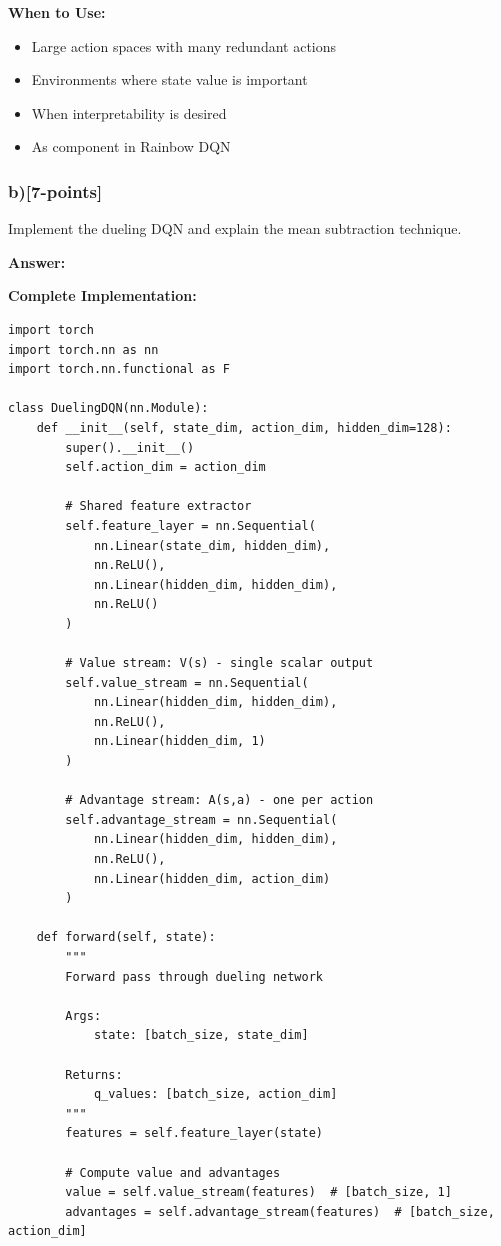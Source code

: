 \documentclass[12pt]{article}
\begin{document}
{{\textbf{When to Use:}
\begin{itemize}
\item Large action spaces with many redundant actions
\item Environments where state value is important
\item When interpretability is desired
\item As component in Rainbow DQN
\end{itemize}

\subsubsection{b)[7-points]} Implement the dueling DQN and explain the mean subtraction technique.

\textbf{Answer:}

\textbf{Complete Implementation:}

\begin{verbatim}
import torch
import torch.nn as nn
import torch.nn.functional as F

class DuelingDQN(nn.Module):
    def __init__(self, state_dim, action_dim, hidden_dim=128):
        super().__init__()
        self.action_dim = action_dim
        
        # Shared feature extractor
        self.feature_layer = nn.Sequential(
            nn.Linear(state_dim, hidden_dim),
            nn.ReLU(),
            nn.Linear(hidden_dim, hidden_dim),
            nn.ReLU()
        )
        
        # Value stream: V(s) - single scalar output
        self.value_stream = nn.Sequential(
            nn.Linear(hidden_dim, hidden_dim),
            nn.ReLU(),
            nn.Linear(hidden_dim, 1)
        )
        
        # Advantage stream: A(s,a) - one per action
        self.advantage_stream = nn.Sequential(
            nn.Linear(hidden_dim, hidden_dim),
            nn.ReLU(),
            nn.Linear(hidden_dim, action_dim)
        )
    
    def forward(self, state):
        """
        Forward pass through dueling network
        
        Args:
            state: [batch_size, state_dim]
        
        Returns:
            q_values: [batch_size, action_dim]
        """
        features = self.feature_layer(state)
        
        # Compute value and advantages
        value = self.value_stream(features)  # [batch_size, 1]
        advantages = self.advantage_stream(features)  # [batch_size, action_dim]
        

\end{verbatim}}}
\end{document}
